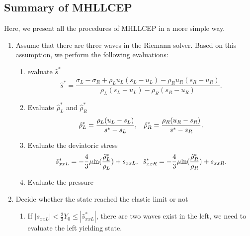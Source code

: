 \documentclass{article}
\numberwithin{equation}{section}
\numberwithin{table}{section}
\begin{document}
\subsection{Summary of MHLLCEP}
Here, we present all the procedures of MHLLCEP in a more simple way.
\begin{enumerate}
  \item  Assume  that there are three  waves in the Riemann solver. Based on this assumption, we perform the following evaluations:
  \begin{enumerate}
    \item evaluate  $\hat{s}^*$
    \begin{equation*}
       \hat{s}^* = \frac{\sigma_L-\sigma_R+\rho_L u_L(s_L-u_L)-\rho_R u_R(s_R-u_R)}{\rho_L(s_L-u_L)-\rho_R(s_R-u_R)}.
   \end{equation*}
    \item Evaluate  $\hat{\rho}_L^*$ and $\hat{\rho}_R^*$
    \begin{equation*}
       \hat{\rho}_L^* = \frac{\rho_L(u_L-s_L)}{s^*-s_L}, \hspace{0.3cm}  \hat{\rho}_R^* = \frac{\rho_R(u_R-s_R)}{s^*-s_R}.
    \end{equation*}
    \item Evaluate  the deviatoric stress
       \begin{equation*}
        \hat{s}_{xxL}^*=-\frac{4}{3}\mu\text{ln}(\frac{\hat{\rho}_L^*}{\rho_L})+s_{xxL},\hspace{0.2cm}  \hat{s}_{xxR}^*=-\frac{4}{3}\mu\text{ln}(\frac{\hat{\rho}_R^*}{\rho_R})+s_{xxR}.
      \end{equation*}
    \item Evaluate the pressure
  \end{enumerate}
  \item Decide whether the state reached the elastic limit or not
        \begin{enumerate}
          \item If $|s_{xxL}| < \frac{2}{3}Y_0 \le |\hat{s}_{xxL}^*| $, there are two waves exist in the left, we need to  evaluate the left yielding state.


\end{enumerate}
\end{enumerate}
\end{document}
